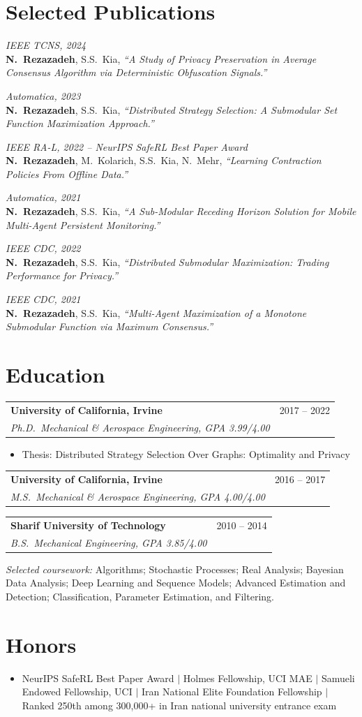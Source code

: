 \documentclass[10pt,letterpaper]{article}
\makeatletter
\newcommand{\resumeSubheading}[4]{
  \vspace{-1pt}
  \begin{tabular*}{\textwidth}[t]{l@{\extracolsep{\fill}}r}
    \textbf{#1} & #2 \\
    \textit{\small #3} & \textit{\small #4} \\
  \end{tabular*}\vspace{-5pt}
}
\newcommand{\resumeItem}[1]{\item\small{#1}\vspace{-2pt}}
\newcommand{\pubentry}[2]{
  \item\small{\textit{#1}\\#2}\vspace{1pt}
}
\makeatother
\begin{document}
\section{Selected Publications}
\begin{enumerate}[leftmargin=0.2in, itemsep=2pt, parsep=2pt, label={[\arabic*]}]
  \pubentry{IEEE TCNS, 2024}{\textbf{N.\ Rezazadeh}, S.S.\ Kia, \textit{``A Study of Privacy Preservation in Average Consensus Algorithm via Deterministic Obfuscation Signals.''}}
  \pubentry{Automatica, 2023}{\textbf{N.\ Rezazadeh}, S.S.\ Kia, \textit{``Distributed Strategy Selection: A Submodular Set Function Maximization Approach.''}}
  \pubentry{IEEE RA-L, 2022 -- NeurIPS SafeRL Best Paper Award}{\textbf{N.\ Rezazadeh}, M.\ Kolarich, S.S.\ Kia, N.\ Mehr, \textit{``Learning Contraction Policies From Offline Data.''}}
  \pubentry{Automatica, 2021}{\textbf{N.\ Rezazadeh}, S.S.\ Kia, \textit{``A Sub-Modular Receding Horizon Solution for Mobile Multi-Agent Persistent Monitoring.''}}
  \pubentry{IEEE CDC, 2022}{\textbf{N.\ Rezazadeh}, S.S.\ Kia, \textit{``Distributed Submodular Maximization: Trading Performance for Privacy.''}}
  \pubentry{IEEE CDC, 2021}{\textbf{N.\ Rezazadeh}, S.S.\ Kia, \textit{``Multi-Agent Maximization of a Monotone Submodular Function via Maximum Consensus.''}}
\end{enumerate}

\section{Education}
\vspace{2pt}
\resumeSubheading{University of California, Irvine}{2017 -- 2022}{Ph.D.\ Mechanical \& Aerospace Engineering, GPA 3.99/4.00}{}
\begin{itemize}[leftmargin=0.15in, itemsep=-2pt, parsep=2pt]
  \resumeItem{Thesis: Distributed Strategy Selection Over Graphs: Optimality and Privacy}
\end{itemize}
\vspace{4pt}
\resumeSubheading{University of California, Irvine}{2016 -- 2017}{M.S.\ Mechanical \& Aerospace Engineering, GPA 4.00/4.00}{}
\vspace{6pt}
\resumeSubheading{Sharif University of Technology}{2010 -- 2014}{B.S.\ Mechanical Engineering, GPA 3.85/4.00}{}
\vspace{8pt}
\small\textit{Selected coursework:} Algorithms; Stochastic Processes; Real Analysis; Bayesian Data Analysis; Deep Learning and Sequence Models; Advanced Estimation and Detection; Classification, Parameter Estimation, and Filtering.

\section{Honors}
\begin{itemize}[leftmargin=0.15in, label={}, itemsep=-2pt, parsep=2pt]
  \item\small NeurIPS SafeRL Best Paper Award $\vert$ Holmes Fellowship, UCI MAE $\vert$ Samueli Endowed Fellowship, UCI $\vert$ Iran National Elite Foundation Fellowship $\vert$ Ranked 250th among 300,000+ in Iran national university entrance exam
\end{itemize}
\end{document}
